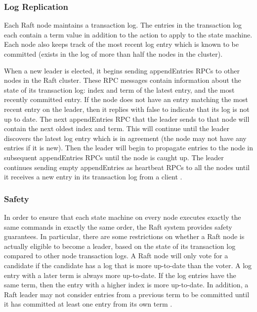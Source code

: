 \documentclass[conference,compsoc]{./IEEEtran/IEEEtran}
\begin{document}
\subsubsection{Log Replication}

Each Raft node maintains a transaction log. The entries in the
transaction log each contain a term value in addition to the action to
apply to the state machine. Each node also keeps track of the most
recent log entry which is known to be committed (exists in the log of
more than half the nodes in the cluster).

When a new leader is elected, it begins sending appendEntries RPCs
to other nodes in the Raft cluster. These RPC messages contain
information about the state of its transaction log: index and term of
the latest entry, and the most recently committed entry. If the node
does not have an entry matching the most recent entry on the leader,
then it replies with false to indicate that its log is not up to
date. The next appendEntries RPC that the leader sends to that
node will contain the next oldest index and term. This will continue
until the leader discovers the latest log entry which is in agreement
(the node may not have any entries if it is new). Then the leader will
begin to propagate entries to the node in subsequent appendEntries
RPCs until the node is caught up. The leader continues sending
empty appendEntries as heartbeat RPCs to all the nodes until it
receives a new entry in its transaction log from a client
\cite[Section~3.5]{raft_thesis:ongaro14}.

\subsubsection{Safety}

In order to ensure that each state machine on every node executes
exactly the same commands in exactly the same order, the Raft system
provides safety guarantees. In particular, there are some restrictions
on whether a Raft node is actually eligible to become a leader, based on
the state of its transaction log compared to other node transaction
logs. A Raft node will only vote for a candidate if the candidate has
a log that is more up-to-date than the voter. A log entry with a later
term is always more up-to-date. If the log entries have the same term,
then the entry with a higher index is more up-to-date. In addition,
a Raft leader may not consider entries from a previous term to be
committed until it has committed at least one entry from its own
term
\cite[Section~3.6]{raft_thesis:ongaro14}.
\end{document}
